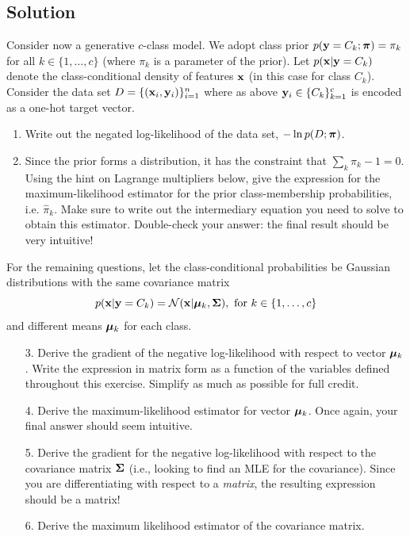 \documentclass[submit]{harvardml}
\begin{document}
\subsection*{Solution}

\begin{problem}
  Consider now a generative $c$-class model.  We adopt class prior
  $p(\mathbf{y} = C_k; \boldsymbol{\pi}) = \pi_k$ for all $k \in \{1, \ldots, c\}$
(where $\pi_k$ is a parameter of the prior).
%
Let  $p(\mathbf{x}|\mathbf{y}=C_k)$ denote
the class-conditional density of features $\mathbf{x}$ (in this
case for class $C_k$). Consider the data set $D = \{(\mathbf{x}_i,
\mathbf{y}_i)\}_{i=1}^n$ where as above $\mathbf{y}_i \in \{C_k\}_{k=1}^c$ is
encoded as a one-hot target vector.
%
\begin{enumerate}
  \item Write out the negated log-likelihood of the data set,
    $-\ln p(D ; \boldsymbol{\pi})$.
%
  \item Since the prior forms a distribution, it has the constraint that
    $\sum_k\pi_k - 1 = 0$.  Using the hint on
Lagrange multipliers below, give the
    expression for the maximum-likelihood estimator for the prior
    class-membership probabilities, i.e.
    $\hat \pi_k.$
    Make sure to write out the intermediary equation you need
    to solve to obtain this estimator. Double-check your answer: the final
    result should be very intuitive!
\end{enumerate}
    For the remaining questions, let the
    class-conditional probabilities be Gaussian distributions with
the same covariance matrix
    $$p(\mathbf{x} | \mathbf{y} = C_k) = \mathcal{N}(\mathbf{x} |  \boldsymbol{\mu}_k, \mathbf{\Sigma}), \text{\ for\ }k \in \{1,\ldots, c\}$$
%
and different means $\boldsymbol{\mu}_k$ for each class.
%
    \begin{enumerate}
  \item[3.] Derive the gradient of the negative log-likelihood with respect to vector $\boldsymbol{\mu}_k$.
    Write the expression in matrix form as a function of the variables defined
    throughout this exercise. Simplify as much as possible for full credit.
  \item[4.] Derive the maximum-likelihood estimator for vector $\boldsymbol{\mu}_k$. Once
    again, your final answer should seem intuitive.
  \item[5.] Derive the gradient for the negative log-likelihood with respect to the
    covariance matrix $\mathbf{\Sigma}$ (i.e., looking
to find an MLE for the covariance).
Since you are differentiating with respect to a
    \emph{matrix}, the resulting expression should be a matrix!
%
  \item[6.] Derive the maximum likelihood estimator of the covariance matrix.
\end{enumerate}

\end{problem}
\end{document}
